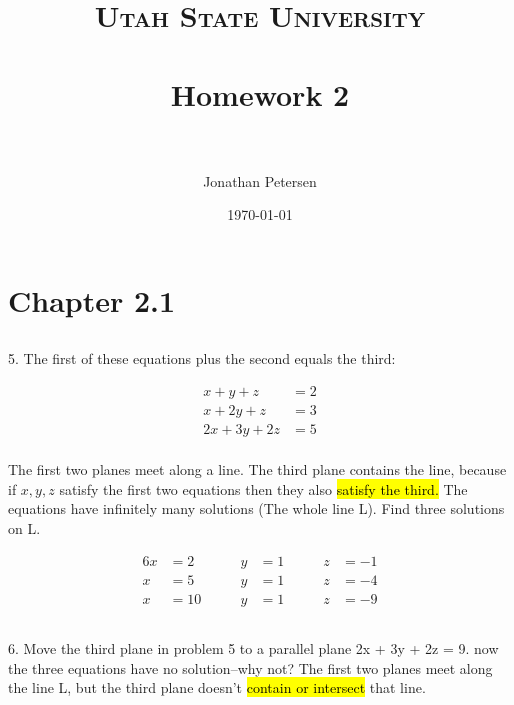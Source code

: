 \documentclass[paper=a4, fontsize=10pt]{scrartcl} %
\title{
\normalfont \normalsize
\textsc{Utah State University} \\ [25pt] %
\horrule{0.5pt} \\[0.4cm] %
\huge Homework 2 \\ %
\horrule{2pt} \\[0.5cm] %
}
\author{Jonathan Petersen} %
\date{\normalsize\today} %
\begin{document}
\maketitle %

\section*{Chapter 2.1}
\subsection*{}
5. The first of these equations plus the second equals the third:

\begin{align*}
 x +  y +  z &= 2 \\
 x + 2y +  z &= 3 \\
2x + 3y + 2z &= 5 \\
\end{align*}

The first two planes meet along a line. The third plane contains the line, because if $x, y, z$ satisfy the first two equations then they also \hl{satisfy the third.} The equations have infinitely many solutions (The whole line L). Find three solutions on L.


\begin{alignat}{6}
x &= 2  \qquad &y &= 1  \qquad &z &= -1 \\
x &= 5  \qquad &y &= 1  \qquad &z &= -4 \\
x &= 10 \qquad &y &= 1  \qquad &z &= -9
\end{alignat}

\subsection*{}
6. Move the third plane in problem 5 to a parallel plane 2x + 3y + 2z = 9. now the three equations have no solution--why not? The first two planes meet along the line L, but the third plane doesn't \hl{contain or intersect} that line.

\subsection*{}
\end{document}
